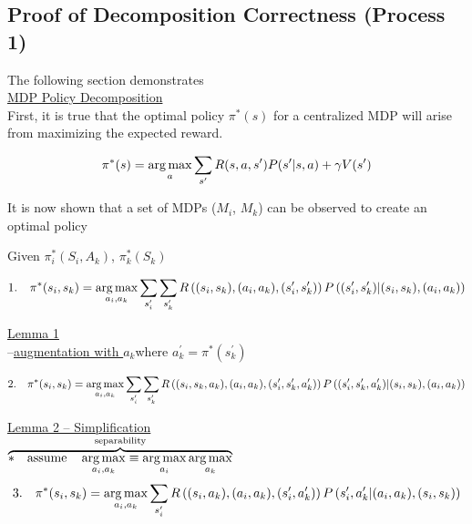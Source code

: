 \subsection{Proof of Decomposition Correctness (Process 1)}

The following section demonstrates\\

\underline{MDP Policy Decomposition}\\

First, it is true that the optimal policy $\pi^\ast(s)$ for a centralized MDP will arise from maximizing the expected reward.

\begin{equation*}
\pi^\ast(s) = \operatorname*{arg\,max}_{a} \sum_{s^\prime} R(s,a,s^\prime) P(s^\prime |s, a) + \gamma V(s^\prime)
\end{equation*}

It is now shown that a set of MDPs ($M_i$, $M_k$) can be observed to create an optimal policy

Given $\pi^\ast_i(S_i, A_k)$, $\pi^\ast_k(S_k)$

\begin{equation*}
1.\quad \pi^\ast(s_i,s_k) = \operatorname*{arg\,max}_{a_i, a_k} \sum_{s^\prime_i} \sum_{s^\prime_k} R\left( (s_i,s_k),(a_i,a_k),(s^\prime_i,s^\prime_k)\right) P\left( (s^\prime_i, s^\prime_k) \middle| (s_i, s_k), (a_i, a_k)  \right)
\end{equation*}

\textasteriskcentered \quad \underline{Lemma 1}\\

--\underline{augmentation with $a_k$}\quad where $a^\prime_k=\pi^\ast(s^\prime_k)$

\begin{equation*}
2.\quad\pi^\ast(s_i, s_k) = \operatorname*{arg\,max}_{a_i, a_k} \sum_{s^\prime_i} \sum_{s^\prime_k} R\left((s_i, s_k, a_k), (a_i,a_k),(s^\prime_i,s^\prime_k,a^\prime_k) \right) P\left( (s^\prime_i, s^\prime_k, a^\prime_k) \middle| (s_i, s_k), (a_i,a_k) \right) 
\end{equation*}

\textasteriskcentered \quad \underline{Lemma 2 -- Simplification}\\

$\overbrace{\ast\quad\text{assume} \quad \operatorname*{arg\,max}_{a_i,a_k} \equiv \operatorname*{arg\,max}_{a_i} \operatorname*{arg\,max}_{a_k}}^{\text{separability}}$\\

 \begin{equation*}
3.\quad\pi^\ast(s_i, s_k) = \operatorname*{arg\,max}_{a_i, a_k} \sum_{s^\prime_i}  R\left((s_i, a_k), (a_i,a_k),(s^\prime_i, a^\prime_k) \right) P\left( s^\prime_i, a^\prime_k \middle| (a_i,a_k),  (s_i, s_k) \right) 
\end{equation*}

